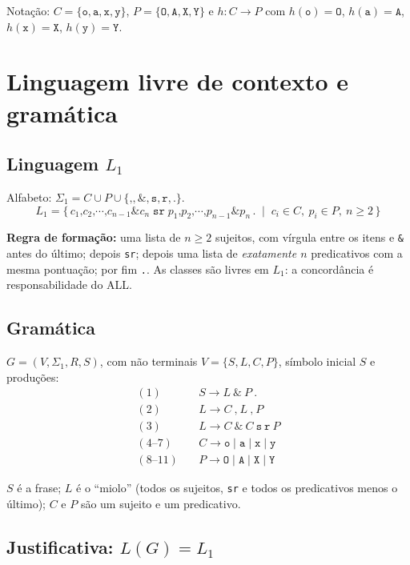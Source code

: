 \documentclass[11pt,a4paper]{article}
\newcommand{\cad}[1]{\texttt{#1}}       %
\newcommand{\Lum}{L_1}
\begin{document}
Notação: $C=\{\cad{o},\cad{a},\cad{x},\cad{y}\}$, $P=\{\cad{O},\cad{A},\cad{X},\cad{Y}\}$ e $h:C\to P$ com $h(\cad{o})=\cad{O}$, $h(\cad{a})=\cad{A}$, $h(\cad{x})=\cad{X}$, $h(\cad{y})=\cad{Y}$.

\section{Linguagem livre de contexto e gramática}

\subsection{Linguagem $\Lum$}

Alfabeto: $\Sigma_1 = C \cup P \cup \{\cad{,},\cad{\&},\cad{s},\cad{r},\cad{.}\}$.
\[
\Lum = \{\, c_1\cad{,}c_2\cad{,}\cdots\cad{,}c_{n-1}\cad{\&}c_n\;\cad{sr}\;p_1\cad{,}p_2\cad{,}\cdots\cad{,}p_{n-1}\cad{\&}p_n\,\cad{.} \;\mid\; c_i\in C,\ p_i\in P,\ n\ge 2 \,\}
\]

\textbf{Regra de formação:} uma lista de $n\ge 2$ sujeitos, com vírgula entre os itens e \cad{\&} antes do último; depois \cad{sr}; depois uma lista de \emph{exatamente $n$} predicativos com a mesma pontuação; por fim \cad{.}. As classes são livres em $\Lum$: a concordância é responsabilidade do ALL.

\subsection{Gramática}

$G = (V, \Sigma_1, R, S)$, com não terminais $V=\{S, L, C, P\}$, símbolo inicial $S$ e produções:
\begin{align*}
(1)\quad & S \to L\ \cad{\&}\ P\ \cad{.} \\
(2)\quad & L \to C\ \cad{,}\ L\ \cad{,}\ P \\
(3)\quad & L \to C\ \cad{\&}\ C\ \cad{s}\ \cad{r}\ P \\
(4\text{--}7)\quad & C \to \cad{o} \mid \cad{a} \mid \cad{x} \mid \cad{y} \\
(8\text{--}11)\quad & P \to \cad{O} \mid \cad{A} \mid \cad{X} \mid \cad{Y}
\end{align*}

$S$ é a frase; $L$ é o ``miolo'' (todos os sujeitos, \cad{sr} e todos os predicativos menos o último); $C$ e $P$ são um sujeito e um predicativo.

\subsection{Justificativa: $L(G)=\Lum$}
\end{document}
